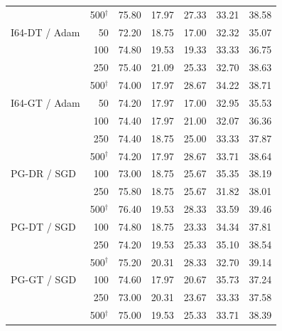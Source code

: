 \begin{table}[p]
\begin{tabular}{lrrrrrr}
 & 500$^{\dagger}$ & 75.80 & 17.97 & 27.33 & 33.21 & 38.58 \\
\addlinespace[2pt]
I64-DT / Adam & 50 & 72.20 & 18.75 & 17.00 & 32.32 & 35.07 \\
 & 100 & 74.80 & 19.53 & 19.33 & 33.33 & 36.75 \\
 & 250 & 75.40 & 21.09 & 25.33 & 32.70 & 38.63 \\
 & 500$^{\dagger}$ & 74.00 & 17.97 & 28.67 & 34.22 & 38.71 \\
\addlinespace[2pt]
I64-GT / Adam & 50 & 74.20 & 17.97 & 17.00 & 32.95 & 35.53 \\
 & 100 & 74.40 & 17.97 & 21.00 & 32.07 & 36.36 \\
 & 250 & 74.40 & 18.75 & 25.00 & 33.33 & 37.87 \\
 & 500$^{\dagger}$ & 74.20 & 17.97 & 28.67 & 33.71 & 38.64 \\
\addlinespace[2pt]
PG-DR / SGD & 100 & 73.00 & 18.75 & 25.67 & 35.35 & 38.19 \\
 & 250 & 75.80 & 18.75 & 25.67 & 31.82 & 38.01 \\
 & 500$^{\dagger}$ & 76.40 & 19.53 & 28.33 & 33.59 & 39.46 \\
\addlinespace[2pt]
PG-DT / SGD & 100 & 74.80 & 18.75 & 23.33 & 34.34 & 37.81 \\
 & 250 & 74.20 & 19.53 & 25.33 & 35.10 & 38.54 \\
 & 500$^{\dagger}$ & 75.20 & 20.31 & 28.33 & 32.70 & 39.14 \\
\addlinespace[2pt]
PG-GT / SGD & 100 & 74.60 & 17.97 & 20.67 & 35.73 & 37.24 \\
 & 250 & 73.00 & 20.31 & 23.67 & 33.33 & 37.58 \\
 & 500$^{\dagger}$ & 75.00 & 19.53 & 25.33 & 33.71 & 38.39 \\
\bottomrule
\end{tabular}
\endgroup
\end{table}
